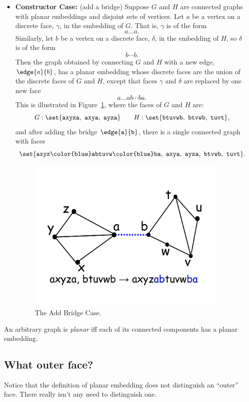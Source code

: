 \begin{definition}
\begin{itemize}
\item \textbf{Constructor Case:} (add a bridge) Suppose $G$ and $H$ are
connected graphs with planar embeddings and disjoint sets of vertices.
Let $a$ be a vertex on a discrete face, $\gamma$, in the embedding of
$G$.  That is, $\gamma$ is of the form
\[
a\dots a.
\]
Similarly, let $b$ be a vertex on a discrete face, $\delta$, in the
embedding of $H$, so $\delta$ is of the form
\[
b\cdots b.
\]
Then the graph obtained by connecting $G$ and $H$ with a new edge,
$\edge{a}{b}$, has a planar embedding whose discrete faces are the union of
the discrete faces of $G$ and $H$, except that faces $\gamma$ and $\delta$
are replaced by one new face
\[
a\dots ab\cdots ba.
\]
This is illustrated in Figure~\ref{fig:add-bridge}, where the faces of
$G$ and $H$ are:
\[
G: \set{\texttt{axyza},\ \texttt{axya},\ \texttt{ayza}}
    \qquad H: \set{\texttt{btuvwb},\ \texttt{btvwb},\ \texttt{tuvt}},
\]
and after adding the bridge $\edge{\texttt{a}}{\texttt{b}}$, there is a
single connected graph with faces
\[
\set{\texttt{axyz{\color{blue}ab}tuvw{\color{blue}ba}},\ 
         \texttt{axya},\ \texttt{ayza},\ \texttt{btvwb},\ \texttt{tuvt}}.
\]
\begin{figure}[h]
\centering \includegraphics[height=3in]{figures/add-bridge}
\caption{The Add Bridge Case.}
\label{fig:add-bridge}
\end{figure}

\end{itemize}

An arbitrary graph is \emph{planar} iff each of its connected components
has a planar embedding.

\end{definition}

\subsection{What outer face?}
Notice that the definition of planar embedding does not distinguish an
``outer'' face.  There really isn't any need to distinguish one.

